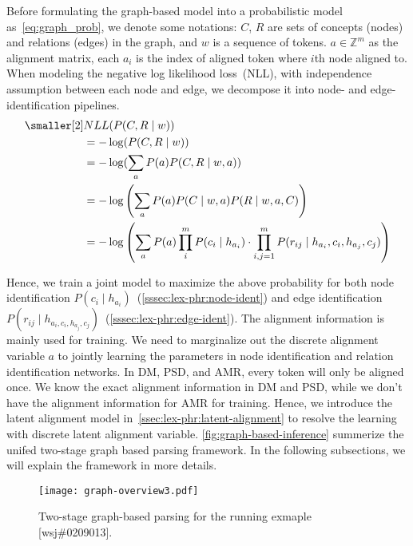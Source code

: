 Before formulating the graph-based model into a probabilistic model
as~\autoref{eq:graph_prob}, we denote some notations: $C$, $R$ are
sets of concepts (nodes) and relations (edges) in the graph, and $w$
is a sequence of tokens.  $a \in {\mathbb{Z}}^m$ as the alignment
matrix, each $a_{i}$ is the index of aligned token where $i$th node
aligned to. When modeling the negative log likelihood loss~(NLL), with
independence assumption between each node and edge, we decompose it
into node- and edge-identification pipelines.
\begin{equation}
  \label{eq:graph_prob}
\begin{aligned} \smaller[2]
 & NLL(P(C,R \mid w)) \\
 & = - \log(P(C,R \mid w)) \\
 & = - \log(\sum_{a}{P(a) P(C,R \mid w,a)}) \\
 & = - \log\left(\sum_{a}P(a) P(C \mid w, a) P(R\mid w,a,C)\right) \\
 & = - \log\left(\sum_{a}P(a) \prod_{i}^{m} P(c_{i} \mid h_{a_{i}}) \cdot \prod_{i,j=1}^{m}P(r_{ij} \mid h_{a_{i}}, c_{i}, h_{a_{j}}, c_{j})\right)
\end{aligned}
\end{equation}

Hence, we train a joint model to maximize the above probability for
both node identification
$P(c_{i} \mid h_{a_{i}})$~(\autoref{sssec:lex-phr:node-ident}) and edge
identification
$P(r_{ij} \mid h_{{a_{i}}, c_{i},h_{a_{j}},
  c_{j}})$~(\autoref{sssec:lex-phr:edge-ident}). The alignment
information is mainly used for training. We need to marginalize out
the discrete alignment variable $a$ to jointly learning the parameters
in node identification and relation identification networks. In DM,
PSD, and AMR, every token will only be aligned once. We know the exact
alignment information in DM and PSD, while we don't have the alignment
information for AMR for training. Hence, we introduce the latent
alignment model in~\autoref{ssec:lex-phr:latent-alignment} to resolve
the learning with discrete latent alignment
variable. \autoref{fig:graph-based-inference} summerize the unifed
two-stage graph based parsing framework. In the following subsections,
we will explain the framework in more details.

\begin{figure}[!tbp] \centering
  \texttt{[image: graph-overview3.pdf]}
  \caption{\label{fig:graph-based-inference} Two-stage graph-based
    parsing for the running exmaple [wsj\#0209013].}
\end{figure}

